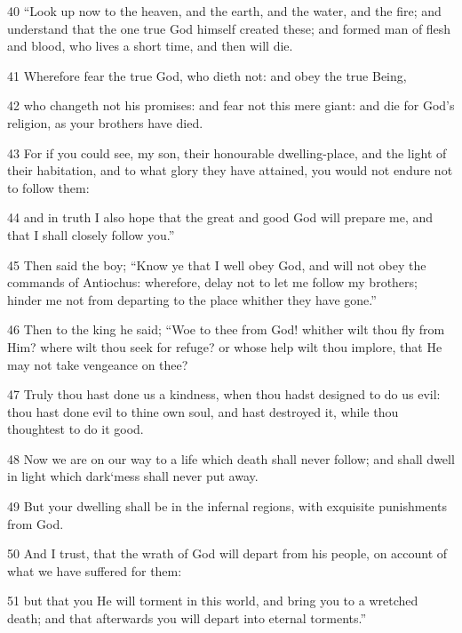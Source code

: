 \par 40 “Look up now to the heaven, and the earth, and the water, and the fire; and understand that the one true God himself created these; and formed man of flesh and blood, who lives a short time, and then will die. 

\par 41 Wherefore fear the true God, who dieth not: and obey the true Being, 

\par 42 who changeth not his promises: and fear not this mere giant: and die for God’s religion, as your brothers have died. 

\par 43 For if you could see, my son, their honourable dwelling-place, and the light of their habitation, and to what glory they have attained, you would not endure not to follow them: 

\par 44 and in truth I also hope that the great and good God will prepare me, and that I shall closely follow you.” 

\par 45 Then said the boy; “Know ye that I well obey God, and will not obey the commands of Antiochus: wherefore, delay not to let me follow my brothers; hinder me not from departing to the place whither they have gone.” 

\par 46 Then to the king he said; “Woe to thee from God! whither wilt thou fly from Him? where wilt thou seek for refuge? or whose help wilt thou implore, that He may not take vengeance on thee? 

\par 47 Truly thou hast done us a kindness, when thou hadst designed to do us evil: thou hast done evil to thine own soul, and hast destroyed it, while thou thoughtest to do it good. 

\par 48 Now we are on our way to a life which death shall never follow; and shall dwell in light which dark‘mess shall never put away. 

\par 49 But your dwelling shall be in the infernal regions, with exquisite punishments from God. 

\par 50 And I trust, that the wrath of God will depart from his people, on account of what we have suffered for them: 

\par 51 but that you He will torment in this world, and bring you to a wretched death; and that afterwards you will depart into eternal torments.” 

